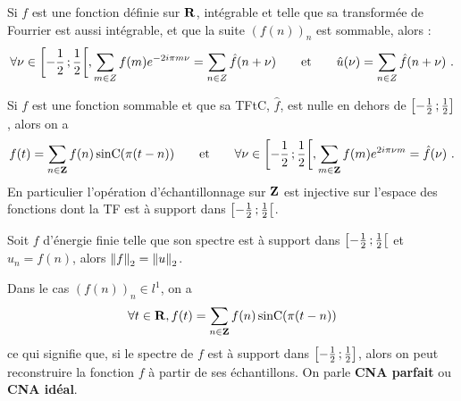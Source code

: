 \begin{thm}
	Si $f$ est une fonction définie sur $\mathbf{R}$, intégrable et telle que sa transformée de Fourrier est aussi intégrable, et que la suite $(f(n))_n$ est sommable, alors :
	\vspace{-0.15cm}$$
	\forall \nu \in \intfo{-\frac{1}{2}}{\frac{1}{2}}, \sum_{m\in Z} f(m)e^{-2i\pi m\nu } = \sum_{n\in Z} \hat{f}(n+\nu )
	\qquad \text{et} \qquad
	\hat{u}(\nu ) = \sum_{n\in Z} \hat{f}(n+\nu )\ .
	\vspace{-0.15cm}$$
\end{thm}

\begin{thm}
	Si $f$ est une fonction sommable et que sa TFtC, $\hat{f}$, est nulle en dehors de $\mathopen{}\mathclose{\left[-\frac{1}{2}\mathclose{}\mathpunct{};\frac{1}{2}\right]}$, alors on a
	\vspace{-0.2cm}$$
	f(t)=\sum_{n\in \Z} f(n) \sinC (\pi (t-n))
	\qquad \text{et} \qquad
	\forall \nu \in \intfo{-\frac{1}{2}}{\frac{1}{2}}, \sum_{m \in \Z} f(m) e^{2i\pi \nu m} = \hat{f}(\nu)\ .
	\vspace{-0.17cm}$$
	En particulier l'opération d'échantillonnage sur $\mathbf{Z}$ est injective sur l'espace des fonctions dont la TF est à support dans $\mathopen{}\mathclose{\left[-\frac{1}{2}\mathclose{}\mathpunct{};\frac{1}{2}\right[}$.
\end{thm}

\begin{thm}
	Soit $f$ d'énergie finie telle que son spectre est à support dans $\mathopen{}\mathclose{\left[-\frac{1}{2}\mathclose{}\mathpunct{};\frac{1}{2}\right[}$ et $u_{n} = f(n)$, alors $\left\lVert f\right\rVert_{2} = \left\lVert u\right\rVert_{2}$.
\end{thm}

\begin{pop}
	Dans le cas $(f(n))_n \in l^1$, on a
	\vspace{-0.15cm}$$
	\forall t \in \R, f(t) = \sum_{n\in \Z} f(n) \sinC (\pi (t-n))
	\vspace{-0.15cm}$$
	ce qui signifie que, si le spectre de $f$ est à support dans $\mathopen{}\mathclose{\left[-\frac{1}{2}\mathclose{}\mathpunct{};\frac{1}{2}\right]}$, alors on peut reconstruire la fonction $f$ à partir de ses échantillons.
	On parle \textbf{CNA parfait} ou \textbf{CNA idéal}.
\end{pop}

